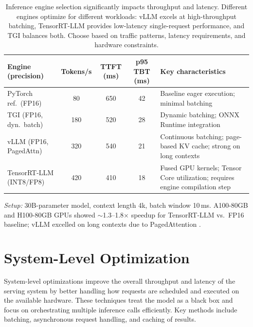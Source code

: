 \begin{table}[t]
\centering
\small
\caption{Inference engine selection significantly impacts throughput and latency. Different engines optimize for different workloads: vLLM excels at high-throughput batching, TensorRT-LLM provides low-latency single-request performance, and TGI balances both. Choose based on traffic patterns, latency requirements, and hardware constraints.}
\label{tab:ch07_engine_bench}
\begin{threeparttable}
\setlength{\tabcolsep}{5pt}
\renewcommand{\arraystretch}{1.35}
\begin{tabularx}{\linewidth}{@{}>{\raggedright\arraybackslash}p{3.6cm}
  S[table-format=3]
  S[table-format=3]
  S[table-format=2]
  >{\raggedright\arraybackslash}X
@{}}
\toprule
{}
\textbf{Engine (precision)} &
{\textbf{Tokens/s}} &
{\textbf{TTFT (ms)}} &
{\textbf{p95 TBT (ms)}} &
\textbf{Key characteristics} \\
\midrule
PyTorch ref.\ (FP16)     &  80  & 650 & 42  & Baseline eager execution; minimal batching \\
\addlinespace[2pt]
TGI (FP16, dyn.\ batch)  & 180  & 520 & 28  & Dynamic batching; ONNX Runtime integration \\
\addlinespace[2pt]
vLLM (FP16, PagedAttn)   & 320  & 540 & 21  & Continuous batching; page-based KV cache; strong on long contexts \\
\addlinespace[2pt]
TensorRT-LLM (INT8/FP8)  & 420  & 410 & 18  & Fused GPU kernels; Tensor Core utilization; requires engine compilation step \\
\bottomrule
\end{tabularx}
\begin{tablenotes}[flushleft]\footnotesize
\item \emph{Setup:} 30B-parameter model, context length 4k, batch window 10\,ms. A100-80GB and H100-80GB GPUs showed $\sim$1.3--1.8$\times$ speedup for TensorRT-LLM vs.\ FP16 baseline; vLLM excelled on long contexts due to PagedAttention \cite{Kwon2023vLLM,NVIDIA2023Hopper}.
\end{tablenotes}
\end{threeparttable}
\end{table}

\FloatBarrier
\section{System-Level Optimization}
\label{sec:perf-system}
System-level optimizations improve the overall throughput and latency of the serving system by better handling how requests are scheduled and executed on the available hardware. These techniques treat the model as a black box and focus on orchestrating multiple inference calls efficiently. Key methods include batching, asynchronous request handling, and caching of results.

